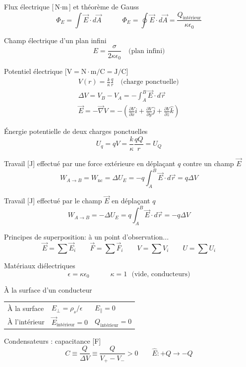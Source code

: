 \documentclass[10pt,landscape]{article}
\newcommand{\halfline}{\vspace{0.5em}}
\newcommand{\tableindent}{\hspace{1.5em}}
\newcommand{\uvec}[1]{\ensuremath{{\hat{#1}}}}
\begin{document}
\begin{multicols}{3}
Flux électrique [$\si{\newton\cdot\metre}$] et théorème de Gauss
\[ 
\Phi_E = \int \vec{E}\cdot d\vec{A}
\qquad\quad
\Phi_E = \oint \vec{E}\cdot d\vec{A} = \frac{Q_\text{intérieur}}{\kappa \epsilon_0} \]

Champ électrique d'un plan infini
\[ E = \frac{\sigma}{2\kappa\epsilon_0} \quad\text{(plan infini)} \]

Potentiel électrique [$\si{\volt} = \si{\newton\cdot\metre/\coulomb} = \si{\joule/\coulomb}$]
\begin{gather*}
	V(r) = \frac{k}{\kappa}  \frac{q}{r } \quad \text{(charge ponctuelle)} \\
	\Delta V = V_B - V_A  = -\int_A^B \vec{E}\cdot d\vec{r} \\
	 \vec{E} = -\vec\nabla V = - \left( \frac{\partial V}{\partial x}\uvec{i} + \frac{\partial V}{\partial y}\uvec{j} + \frac{\partial V}{\partial z}\uvec{k} \right) 
\end{gather*}

Énergie potentielle de deux charges ponctuelles
\[ U_q = qV = \frac{k}{\kappa}  \frac{qQ}{r} = U_Q\]

Travail [\si{\joule}] effectué par une force extérieure en déplaçant $q$ contre un champ $\vec{E}$
\[ W_{A\to B} = W_\text{nc} = \Delta U_E = -q\int_{A}^{B} \vec{E}\cdot d\vec{r} = q\Delta V \]

Travail [\si{\joule}] effectué par le champ $\vec{E}$ en déplaçant $q$ 
\[ W_{A\to B} =  -\Delta U_E = q\int_{A}^{B} \vec{E}\cdot d\vec{r} =- q\Delta V \]

Principes de superposition: à un point d'observation...
\[ \vec{E} = \sum \vec{E}_i 
\qquad
 \vec{F} = \sum \vec{F}_i 
\qquad
V = \sum {V}_i 
\qquad
U = \sum {U}_i 
\]

Matériaux diélectriques
\[ \epsilon = \kappa \epsilon_0 
\qquad\quad
\kappa = 1 \text{ {(vide, conducteurs)}}\]

À la surface d'un conducteur  \\
\halfline
\begin{tabular}{@{\tableindent}lll@{}}
	À la surface & $ E_\perp = {\rho_s}/{\epsilon}$ & $E_\parallel = 0 $ \\
	À l'intérieur  & $\vec{E}_\text{intérieur} = 0 $ &  $Q_\text{intérieur} = 0 $ \\
\end{tabular}
\halfline

Condensateurs : capacitance [\si{\farad}] 
\[ C \equiv \frac{Q}{\Delta V} \equiv \frac{Q}{V_+ - V_-} > 0 
\qquad \uvec{E}: +Q \to -Q \]


\end{multicols}
\end{document}
